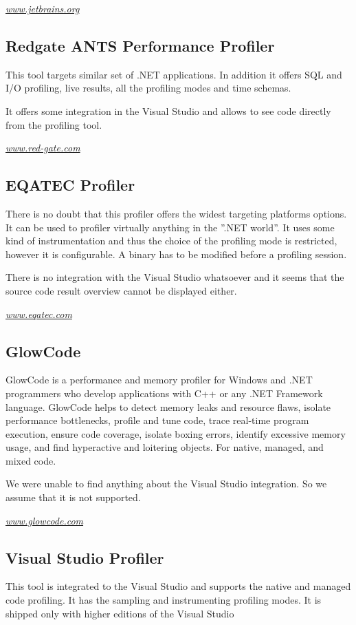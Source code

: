 \textit{\href{http://www.jetbrains.org}{www.jetbrains.org}	}

\subsection{Redgate ANTS Performance Profiler}
This tool targets similar set of .NET applications. In addition it offers SQL and I/O  profiling, live results, all the profiling modes and time schemas. 

It offers some integration in the Visual Studio and allows to see code directly from the profiling tool. 

\textit{\href{http://www.red-gate.com}{www.red-gate.com}}

\subsection{EQATEC Profiler}
There is no doubt that this profiler offers the widest targeting platforms options. It can be used to profiler virtually anything in the ''.NET world''. It uses some kind of instrumentation and thus the choice of the profiling mode is restricted, however it is configurable. A binary has to be modified before a profiling session.

There is no integration with the Visual Studio whatsoever and it seems that the source code result overview cannot be displayed either.

\textit{\href{http://www.eqatec.com}{www.eqatec.com}}

\subsection{GlowCode}
GlowCode is a performance and memory profiler for Windows and .NET programmers who develop applications with C++ or any .NET Framework language. GlowCode helps to detect memory leaks and resource flaws, isolate performance bottlenecks, profile and tune code, trace real-time program execution, ensure code coverage, isolate boxing errors, identify excessive memory usage, and find hyperactive and loitering objects. For native, managed, and mixed code. \cite{01GlowCodeWeb} 

We were unable to find anything about the Visual Studio integration. So we assume that it is not supported.


\textit{\href{http://www.glowcode.com/}{www.glowcode.com}}

\subsection{Visual Studio Profiler}
This tool is integrated to the Visual Studio and supports the native and managed code profiling. It has the sampling and instrumenting profiling modes. It is shipped only with higher editions of the Visual Studio

